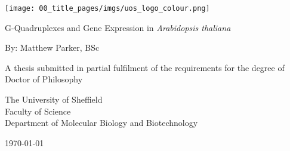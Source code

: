\begin{titlepage}
    \begin{center}

        \texttt{[image: 00\_title\_pages/imgs/uos\_logo\_colour.png]}
        
        \vspace*{2.5cm}
        
        \huge
        G-Quadruplexes and Gene Expression in \textit{Arabidopsis thaliana}
        
        \vspace{1.5cm}
        
        \normalsize
        By:
        \Large
        Matthew Parker, BSc

        \vspace{1.5cm}

        \normalsize
        A thesis submitted in partial fulfilment of the requirements for the degree of\\
Doctor of Philosophy 

        
        \vfill
        
        \normalsize
        The University of Sheffield\\
        Faculty of Science\\
        Department of Molecular Biology and Biotechnology\\

        \vspace{0.8cm}
        
        \normalsize
        \today


    \end{center}
    \afterpage{\blankpage}
\end{titlepage}
\restoregeometry